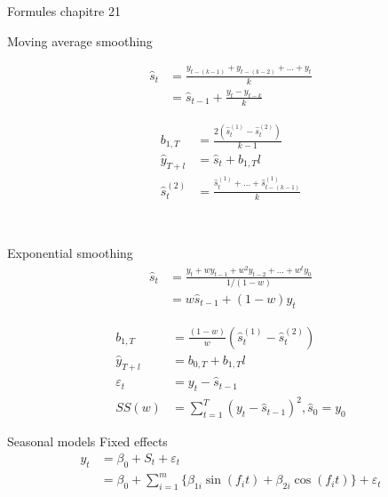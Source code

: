 \documentclass[12pt, titlepage, french]{report}
\begin{document}
\begin{FORMULA_SUMM}{Formules chapitre 21}
\begin{multicols*}{2}
Moving average smoothing

\begin{minipage}[ht]{0.5\linewidth}
\setlength{\mathindent}{-1cm}
\begin{align*}
	\hat{s}_{t}
		&=	\frac{y_{t - (k - 1)} + y_{t - (k - 2)} + \dots + y_{t}}{k}	\\
		&=	\hat{s}_{t - 1} + \frac{y_{t} - y_{t - k}}{k}	
\end{align*}
\setlength{\mathindent}{1cm}
\end{minipage}
\setlength{\mathindent}{-1cm}
\begin{align*}
	b_{1, T}	
		&=	\frac{2(\hat{s}_{t}^{(1)} - \hat{s}_{t}^{(2)})}{k - 1}	\\
	\hat{y}_{T + l}
		&=	\hat{s}_{t} + b_{1, T} l	\\
	\hat{s}_{t}^{(2)}	
		&=	\frac{\hat{s}_{t}^{(1)} + \dots + \hat{s}_{t - (k - 1)}^{(1)}}{k}	
\end{align*}
\setlength{\mathindent}{1cm}

\vfill\null
\

\begin{minipage}[ht]{0.5\linewidth}
Exponential smoothing
\setlength{\mathindent}{-1cm}
\begin{align*}
	\hat{s}_{t}
		&=	\frac{y_{t} + w y_{t - 1} + w^{2} y_{t - 2} + \dots + w^{t} y_{0}}{1/(1 - w)}		\\
		&=	w \hat{s}_{t - 1} + (1 - w) y_{t}	
\end{align*}
\setlength{\mathindent}{1cm}
\end{minipage}
\setlength{\mathindent}{-1cm}
\begin{align*}
	b_{1, T}	
		&=	\frac{(1 - w)}{w}\left(\hat{s}_{t}^{(1)} - \hat{s}_{t}^{(2)}\right)	\\
	\hat{y}_{T + l}
		&=	b_{0, T} + b_{1, T} l	\\
	\varepsilon_{t}
		&=	y_{t} - \hat{s}_{t - 1}	\\
	SS(w)
		&=	\sum_{t = 1}^{T}(y_{t} - \hat{s}_{t - 1})^{2}, \hat{s}_{0} = y_{0}	
\end{align*}
\setlength{\mathindent}{1cm}
\end{multicols*}

Seasonal models
Fixed effects
\begin{align*}
	y_{t}
		&=	\beta_{0} + S_t + \varepsilon_{t}	\\
		&=	\beta_{0} + \sum_{i = 1}^{m} \{ \beta_{1i} \sin(f_{i}t) + \beta_{2i} \cos(f_{i}t)	 \} + \varepsilon_{t} 
\end{align*}


\end{FORMULA_SUMM}
\end{document}
